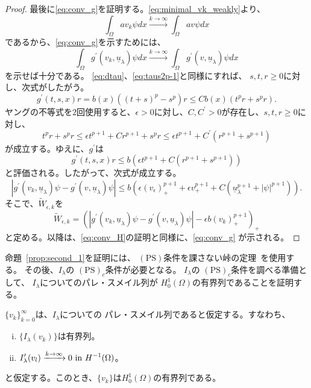 \begin{proof}
 最後に\eqref{eq:conv_g}を証明する。\eqref{eq:minimal_vk_weakly}より、
 \[
  \int_\Omega a v_k \psi dx \xrightarrow{k \to \infty} \int_\Omega
 av\psi dx
 \]
 であるから、\eqref{eq:conv_g}を示すためには、
 \[
  \int_\Omega g^\prime(v_k, \underline{u}_\lambda)\psi dx \xrightarrow{
  k \to \infty } 
  \int_\Omega g^\prime(v, \underline{u}_\lambda)\psi dx
 \]
 を示せば十分である。
 \eqref{eq:dtau}、\eqref{eq:taus2p-1}と同様にすれば、
 $s, t, r \geq 0$に対し、次式がしたがう。
 \[
  g^\prime(t, s, x)r = b(x) \left( (t+s)^p - s^p \right) r \leq C b(x)
 \left( t^pr + s^p r \right).
 \]
 ヤングの不等式を$2$回使用すると、$\epsilon > 0$に対し、$C, C^\prime >
 0$が存在し、$s, t, r \geq 0$に対し、
 \[
  t^p r + s^p r \leq \epsilon t^{p+1} + C r^{p+1} + s^p r \leq
 \epsilon t^{p+1} + C^\prime (r^{p+1} + s^{p+1})
 \]
 が成立する。ゆえに、$g^\prime$は
 \[
  g^\prime(t, s, x)r \leq b \left( \epsilon t^{p+1} + C ( r^{p+1} +
 s^{p+1}) \right)
 \]
 と評価される。したがって、次式が成立する。
 \[  
  \left\lvert g^\prime(v_k, \underline{u}_\lambda)\psi - g^\prime(v,
   \underline{u}_\lambda)\psi \right\rvert \leq b \left( \epsilon
   (v_\epsilon)_+^{p+1}  + \epsilon v_+^{p+1} + C
   (\underline{u}_\lambda^{p+1} + \lvert \psi \rvert^{p+1})
                                 \right).
 \]
 そこで、$\tilde{W}_{\epsilon, k}$を
\[  \tilde{W}_{\epsilon, k} = 
   \left( \left\lvert g^\prime(v_k, \underline{u}_\lambda)\psi - g^\prime(v,
    \underline{u}_\lambda)\psi \right\rvert
  -\epsilon b (v_k)_+^{p+1}
          \right)_+ \]
 と定める。以降は、\eqref{eq:conv_H}の証明と同様に、\eqref{eq:conv_g}
 が示される。\qedhere
\end{proof}

命題~\ref{prop:second_1}を証明には、
$(\mathrm{PS})$条件を課さない峠の定理~\cite{MR0370183}を使用する。
その後、$I_\lambda$の
$(\mathrm{PS})_c$条件が必要となる。
$I_\lambda$の
$(\mathrm{PS})_c$条件を調べる準備として、
$I_\lambda$についてのパレ・スメイル列が
$H_0^1(\Omega)$の有界列であることを証明する。

\begin{lem} \label{lem:PS_seq}
 $\{ v_k \}_{k=0}^\infty$は、$I_\lambda$についての
 パレ・スメイル列であると仮定する。すなわち、
 \begin{enumerate}[(i)]
  \item $\{ I_\lambda(v_k) \}$は有界列。
  \item $\displaystyle I^\prime_{\lambda} (v_l) \xrightarrow{k \to
        \infty} 0 ~\text{in}~ H^{-1}(\Omega)$。
 \end{enumerate}
 と仮定する。このとき、$\{ v_k \}$は$H_0^1(\Omega)$の有界列である。
\end{lem}

